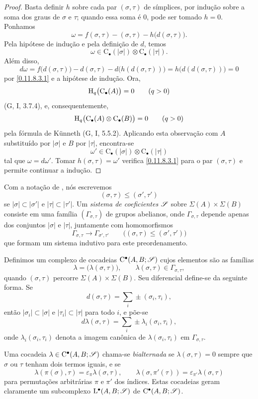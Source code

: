 \begin{proof}
Basta definir $h$ sobre cada par $(\sigma,\tau)$ de símplices, por
indução sobre a soma dos graus de $\sigma$ e $\tau$; quando essa soma
é $0$, pode ser tomado $h=0$.
Ponhamos
\[
  \omega
  =
  f(\sigma,\tau)-(\sigma,\tau)-h\bigl(d(\sigma,\tau)\bigr).
\]
Pela hipótese de indução e pela definição de $d$, temos
\[
  \omega
  \in
  \mathrm{C}_\bullet(|\sigma|)
  \otimes
  \mathrm{C}_\bullet(|\tau|).
\]
Além disso,
\[
  d\omega
  =
  f\bigl(d(\sigma,\tau)\bigr)
  -d(\sigma,\tau)
  -d\bigl(h(d(\sigma,\tau))\bigr)
  =
  h\bigl(d(d(\sigma,\tau))\bigr)
  =
  0
\]
por \eqref{0.11.8.3.1} e a hipótese de indução.
Ora,
\[
  \mathrm{H}_q\bigl(\mathrm{C}_\bullet(A)\bigr)=0
  \qquad(q>0)
\]
(G, I, 3.7.4), e, consequentemente,
\[
  \mathrm{H}_q\bigl(
    \mathrm{C}_\bullet(A)\otimes\mathrm{C}_\bullet(B)
  \bigr)=0
  \qquad(q>0)
\]
pela fórmula de K\"unneth (G, I, 5.5.2).
Aplicando esta observação com $A$ substituído por $|\sigma|$ e $B$ por
$|\tau|$, encontra-se
\[
  \omega'
  \in
  \mathrm{C}_\bullet(|\sigma|)
  \otimes
  \mathrm{C}_\bullet(|\tau|)
\]
tal que $\omega=d\omega'$.
Tomar $h(\sigma,\tau)=\omega'$ verifica \eqref{0.11.8.3.1} para o par
$(\sigma,\tau)$ e permite continuar a indução.
\end{proof}

\begin{env}[11.8.4]
\label{0.11.8.4}
Com a notação de , nós escrevemos
\[
  (\sigma,\tau)\leq(\sigma',\tau')
\]
se $|\sigma|\subset|\sigma'|$ e $|\tau|\subset|\tau'|$.
Um \emph{sistema de coeficientes} $\mathscr{S}$ sobre
$\Sigma(A)\times\Sigma(B)$ consiste em uma família
$(\Gamma_{\sigma,\tau})$ de grupos abelianos, onde
$\Gamma_{\sigma,\tau}$ depende apenas dos conjuntos $|\sigma|$ e
$|\tau|$, juntamente com homomorfismos
\[
  \Gamma_{\sigma,\tau}
  \longrightarrow
  \Gamma_{\sigma',\tau'}
  \qquad
  \bigl((\sigma,\tau)\leq(\sigma',\tau')\bigr)
\]
que formam um sistema indutivo para este preordenamento.

Definimos um complexo de cocadeias $\mathrm{C}^\bullet(A,B;\mathscr{S})$ cujos elementos
são as famílias
\[
  \lambda=\bigl(\lambda(\sigma,\tau)\bigr),
  \qquad
  \lambda(\sigma,\tau)\in\Gamma_{\sigma,\tau},
\]
quando $(\sigma,\tau)$ percorre $\Sigma(A)\times\Sigma(B)$.
Seu diferencial define-se da seguinte forma.
Se
\[
  d(\sigma,\tau)=\sum_i\pm(\sigma_i,\tau_i),
\]
então $|\sigma_i|\subset|\sigma|$ e $|\tau_i|\subset|\tau|$ para todo
$i$, e põe-se
\[
  d\lambda(\sigma,\tau)
  =
  \sum_i\pm\lambda_i(\sigma_i,\tau_i),
\]
onde $\lambda_i(\sigma_i,\tau_i)$ denota a imagem canônica de
$\lambda(\sigma_i,\tau_i)$ em $\Gamma_{\sigma,\tau}$.

Uma cocadeia $\lambda\in\mathrm{C}^\bullet(A,B;\mathscr{S})$ chama-se
\emph{bialternada} se $\lambda(\sigma,\tau)=0$ sempre que $\sigma$
ou $\tau$ tenham dois termos iguais, e se
\[
  \lambda(\pi(\sigma),\tau)
  =
  \varepsilon_\pi\lambda(\sigma,\tau),
  \qquad
  \lambda(\sigma,\pi'(\tau))
  =
  \varepsilon_{\pi'}\lambda(\sigma,\tau)
\]
para permutações arbitrárias $\pi$ e $\pi'$ dos índices.
Estas cocadeias geram claramente um subcomplexo
$\mathrm{L}^\bullet(A,B;\mathscr{S})$ de
$\mathrm{C}^\bullet(A,B;\mathscr{S})$.
\end{env}

